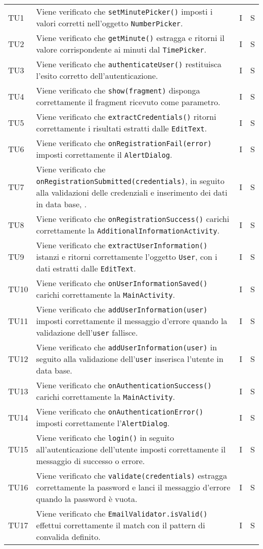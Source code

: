 \begin{longtable}{ >{\centering}p{}  >{\centering}p{} >{\centering}p{}
			>{\centering}p{}}
		TU1 & Viene verificato che \texttt{setMinutePicker()} imposti i valori corretti nell'oggetto \texttt{NumberPicker}. & I & S  \tabularnewline		
		TU2 & Viene verificato che \texttt{getMinute()} estragga e ritorni il valore corrispondente ai minuti dal \texttt{TimePicker}. & I & S \tabularnewline	
		TU3 & Viene verificato che \texttt{authenticateUser()} restituisca l'esito corretto dell'autenticazione. & I & S
		\tabularnewline	
		TU4 & Viene verificato che \texttt{show(fragment)} disponga correttamente il fragment ricevuto come parametro. & I & S
		\tabularnewline	
		TU5 & Viene verificato che \texttt{extractCredentials()} ritorni correttamente i risultati estratti dalle \texttt{EditText}. & I & S\tabularnewline	
		TU6 & Viene verificato che \texttt{onRegistrationFail(error)} imposti correttamente il \texttt{AlertDialog}. & I & S
		\tabularnewline	
		TU7 & Viene verificato che \texttt{onRegistrationSubmitted(credentials)}, in seguito alla validazioni delle credenziali e inserimento dei dati in data base, . & I & S
		\tabularnewline	
		TU8 & Viene verificato che \texttt{onRegistrationSuccess()} carichi correttamente la \texttt{AdditionalInformationActivity}. & I & S
		\tabularnewline	
		TU9 & Viene verificato che \texttt{extractUserInformation()} istanzi e ritorni correttamente l'oggetto \texttt{User}, con i dati estratti dalle \texttt{EditText}. & I & S
		\tabularnewline	
		TU10 & Viene verificato che \texttt{onUserInformationSaved()} carichi correttamente la \texttt{MainActivity}. & I & S
				\tabularnewline	
		TU11 & Viene verificato che \texttt{addUserInformation(user)} imposti correttamente il messaggio d'errore quando la validazione dell'\texttt{user} fallisce. & I & S
		\tabularnewline	
		TU12 & Viene verificato che \texttt{addUserInformation(user)} in seguito alla validazione dell'\texttt{user} inserisca l'utente in data base. & I & S
		\tabularnewline	
		TU13 & Viene verificato che \texttt{onAuthenticationSuccess()} carichi correttamente la \texttt{MainActivity}. & I & S
		\tabularnewline	
		TU14 & Viene verificato che \texttt{onAuthenticationError()} imposti correttamente l'\texttt{AlertDialog}. & I & S
		\tabularnewline	
		TU15 & Viene verificato che \texttt{login()} in seguito all'autenticazione dell'utente imposti correttamente il messaggio di successo o errore. & I & S
		\tabularnewline	
		TU16 & Viene verificato che \texttt{validate(credentials)} estragga correttamente la password e lanci il messaggio d'errore quando la password è vuota. & I & S
		\tabularnewline	
		TU17 & Viene verificato che \texttt{EmailValidator.isValid()} effettui correttamente il match con il pattern di convalida definito. & I & S

\end{longtable}
